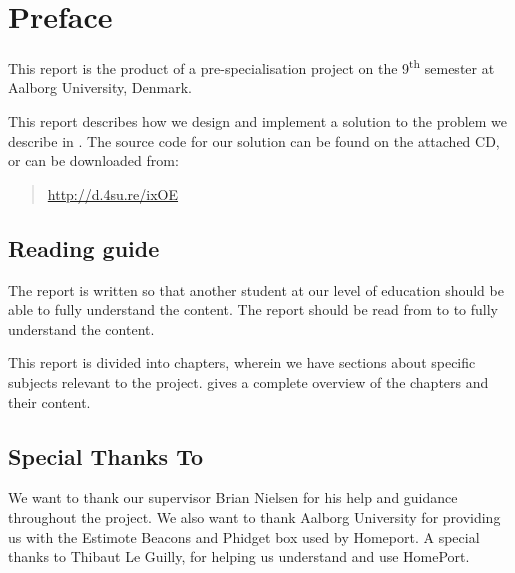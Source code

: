 \section*{Preface}\label{sec:preface}
This report is the product of a pre-specialisation project on the 9\textsuperscript{th} semester at Aalborg University, Denmark. 

This report describes how we design and implement a solution to the problem we describe in . 
The source code for our solution can be found on the attached CD, or can be downloaded from:
\begin{quote}
  \url{http://d.4su.re/ixOE}
\end{quote}

\subsection*{Reading guide}
The report is written so that another student at our level of education should be able to fully understand the content. The report should be read from  to  to fully understand the content. 

This report is divided into chapters, wherein we have sections about specific subjects relevant to the project.  gives a complete overview of the chapters and their content.

\subsection*{Special Thanks To}
We want to thank our supervisor Brian Nielsen for his help and guidance throughout the project. We also want to thank Aalborg University for providing us with the Estimote Beacons and Phidget box used by Homeport. A special thanks to Thibaut Le Guilly, for helping us understand and use HomePort. 

